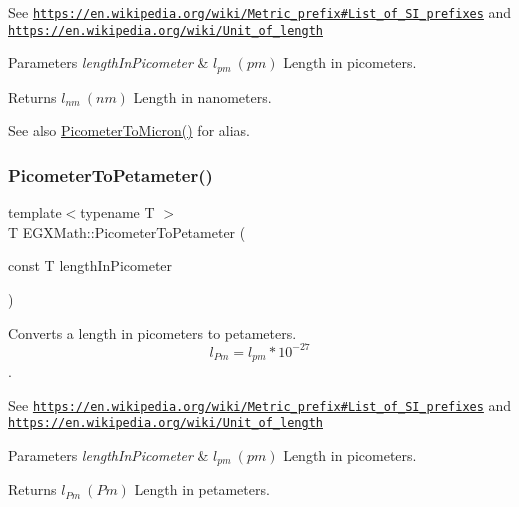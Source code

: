 See \href{https://en.wikipedia.org/wiki/Metric_prefix#List_of_SI_prefixes}{\tt https\+://en.\+wikipedia.\+org/wiki/\+Metric\+\_\+prefix\#\+List\+\_\+of\+\_\+\+S\+I\+\_\+prefixes} and \href{https://en.wikipedia.org/wiki/Unit_of_length}{\tt https\+://en.\+wikipedia.\+org/wiki/\+Unit\+\_\+of\+\_\+length} 
\begin{DoxyParams}{Parameters}
{\em length\+In\+Picometer} & $ l_{pm}\ (pm)$ Length in picometers. \\
\hline
\end{DoxyParams}
\begin{DoxyReturn}{Returns}
$ l_{nm}\ (nm)$ Length in nanometers. 
\end{DoxyReturn}
\begin{DoxySeeAlso}{See also}
\mbox{\hyperlink{group___e_g_x_math-_conversions-_length_conversions-_picometer-_non-_s_i_gad8fddabe74b111596888c370081f725e}{Picometer\+To\+Micron()}} for alias. 
\end{DoxySeeAlso}
\mbox{\label{group___e_g_x_math-_conversions-_length_conversions-_picometer-_s_i_ga491c4ac277c5b63710e9d11aa4b1ecc4}} 
\subsubsection{\texorpdfstring{Picometer\+To\+Petameter()}{PicometerToPetameter()}}
{\footnotesize\ttfamily template$<$typename T $>$ \\
T E\+G\+X\+Math\+::\+Picometer\+To\+Petameter (\begin{DoxyParamCaption}\item[{const T}]{length\+In\+Picometer }\end{DoxyParamCaption})}



Converts a length in picometers to petameters. \[ l_{Pm}=l_{pm} * 10^{-27} \]. 

See \href{https://en.wikipedia.org/wiki/Metric_prefix#List_of_SI_prefixes}{\tt https\+://en.\+wikipedia.\+org/wiki/\+Metric\+\_\+prefix\#\+List\+\_\+of\+\_\+\+S\+I\+\_\+prefixes} and \href{https://en.wikipedia.org/wiki/Unit_of_length}{\tt https\+://en.\+wikipedia.\+org/wiki/\+Unit\+\_\+of\+\_\+length} 
\begin{DoxyParams}{Parameters}
{\em length\+In\+Picometer} & $ l_{pm}\ (pm)$ Length in picometers. \\
\hline
\end{DoxyParams}
\begin{DoxyReturn}{Returns}
$ l_{Pm}\ (Pm)$ Length in petameters. 
\end{DoxyReturn}
\mbox{\label{group___e_g_x_math-_conversions-_length_conversions-_picometer-_s_i_ga208383d9423614bbd8ddf3731114e31e}} 
